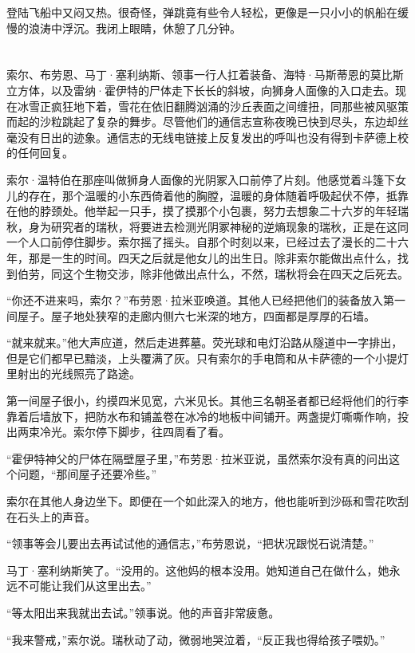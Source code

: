 \documentclass[AutoFakeBold=true]{book}
\begin{document}
登陆飞船中又闷又热。很奇怪，弹跳竟有些令人轻松，更像是一只小小的帆船在缓慢的浪涛中浮沉。我闭上眼睛，休憩了几分钟。

\chapter{}

索尔、布劳恩、马丁·塞利纳斯、领事一行人扛着装备、海特·马斯蒂恩的莫比斯立方体，以及雷纳·霍伊特的尸体走下长长的斜坡，向狮身人面像的入口走去。现在冰雪正疯狂地下着，雪花在依旧翻腾汹涌的沙丘表面之间缠扭，同那些被风驱策而起的沙粒跳起了复杂的舞步。尽管他们的通信志宣称夜晚已快到尽头，东边却丝毫没有日出的迹象。通信志的无线电链接上反复发出的呼叫也没有得到卡萨德上校的任何回复。

索尔·温特伯在那座叫做狮身人面像的光阴冢入口前停了片刻。他感觉着斗篷下女儿的存在，那个温暖的小东西倚着他的胸膛，温暖的身体随着呼吸起伏不停，抵靠在他的脖颈处。他举起一只手，摸了摸那个小包裹，努力去想象二十六岁的年轻瑞秋，身为研究者的瑞秋，将要进去检测光阴冢神秘的逆熵现象的瑞秋，正是在这同一个人口前停住脚步。索尔摇了摇头。自那个时刻以来，已经过去了漫长的二十六年，那是一生的时间。四天之后就是他女儿的出生日。除非索尔能做出点什么，找到伯劳，同这个生物交涉，{\kaishu 除非他做出点什么}，不然，瑞秋将会在四天之后死去。

``你还不进来吗，索尔？''布劳恩·拉米亚唤道。其他人已经把他们的装备放入第一间屋子。屋子地处狭窄的走廊内侧六七米深的地方，四面都是厚厚的石墙。

``就来就来。''他大声应道，然后走进葬墓。荧光球和电灯沿路从隧道中一字排出，但是它们都早已黯淡，上头覆满了灰。只有索尔的手电筒和从卡萨德的一个小提灯里射出的光线照亮了路途。

第一间屋子很小，约摸四米见宽，六米见长。其他三名朝圣者都已经将他们的行李靠着后墙放下，把防水布和铺盖卷在冰冷的地板中间铺开。两盏提灯嘶嘶作响，投出两束冷光。索尔停下脚步，往四周看了看。

``霍伊特神父的尸体在隔壁屋子里，''布劳恩·拉米亚说，虽然索尔没有真的问出这个问题，``那间屋子还要冷些。''

索尔在其他人身边坐下。即便在一个如此深入的地方，他也能听到沙砾和雪花吹刮在石头上的声音。

``领事等会儿要出去再试试他的通信志，''布劳恩说，``把状况跟悦石说清楚。''

马丁·塞利纳斯笑了。``没用的。这他妈的根本没用。她知道自己在做什么，她永远不可能让我们从这里出去。''

``等太阳出来我就出去试。''领事说。他的声音非常疲惫。

``我来警戒，''索尔说。瑞秋动了动，微弱地哭泣着，``反正我也得给孩子喂奶。''
\end{document}
